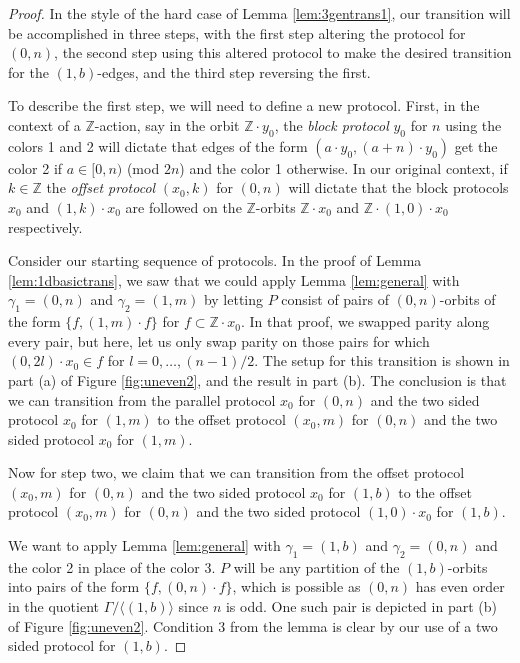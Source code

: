 \documentclass[12pt]{article}
\newcommand{\0}{\varnothing}
\newcommand{\Z}{\mathbb{Z}}
\begin{document}
\begin{proof}
In the style of the hard case of Lemma \ref{lem:3gentrans1}, our transition will be accomplished in three steps, with the first step altering the protocol for $(0,n)$, the second step using this altered protocol to make the desired transition for the $(1,b)$-edges, and the third step reversing the first.

To describe the first step, we will need to define a new protocol. First, in the context of a $\Z$-action, say in the orbit $\Z \cdot y_0$, the \textit{block protocol} $y_0$ for $n$ using the colors 1 and 2 will dictate that edges of the form $(a \cdot y_0 , (a+n) \cdot y_0)$ get the color 2 if $a \in [0,n)$ (mod $2n$) and the color 1 otherwise. In our original context, if $k \in \Z$ the \textit{offset protocol} $(x_0,k)$ for $(0,n)$ will dictate that the block protocols $x_0$ and $(1,k) \cdot x_0$ are followed on the $\Z$-orbits $\Z \cdot x_0$ and $\Z \cdot (1,0) \cdot x_0$ respectively.

Consider our starting sequence of protocols. In the proof of Lemma \ref{lem:1dbasictrans}, we saw that we could apply Lemma \ref{lem:general} with $\gamma_1 = (0,n)$ and $\gamma_2 = (1,m)$ by letting $P$ consist of pairs of $(0,n)$-orbits of the form $\{f,(1,m) \cdot f\}$ for $f \subset \Z \cdot x_0$. In that proof, we swapped parity along every pair, but here, let us only swap parity on those pairs for which $(0,2l) \cdot x_0 \in f$ for $l=0,\ldots,(n-1)/2$. The setup for this transition is shown in part (a) of Figure \ref{fig:uneven2}, and the result in part (b). The conclusion is that we can transition from the parallel protocol $x_0$ for $(0,n)$ and the two sided protocol $x_0$ for $(1,m)$ to the offset protocol $(x_0,m)$ for $(0,n)$ and the two sided protocol $x_0$ for $(1,m)$.

Now for step two, we claim that we can transition from the offset protocol $(x_0,m)$ for $(0,n)$ and the two sided protocol $x_0$ for $(1,b)$ to the offset protocol $(x_0,m)$ for $(0,n)$ and the two sided protocol $(1,0) \cdot x_0$ for $(1,b)$.

We want to apply Lemma \ref{lem:general} with $\gamma_1 = (1,b)$ and $\gamma_2 = (0,n)$ and the color 2 in place of the color 3. $P$ will be any partition of the $(1,b)$-orbits into pairs of the form $\{f, (0,n) \cdot f\}$, which is possible as $(0,n)$ has even order in the quotient $\Gamma / \langle (1,b) \rangle$ since $n$ is odd. One such pair is depicted in part (b) of Figure \ref{fig:uneven2}. Condition 3 from the lemma is clear by our use of a two sided protocol for $(1,b)$.


\end{proof}
\end{document}
